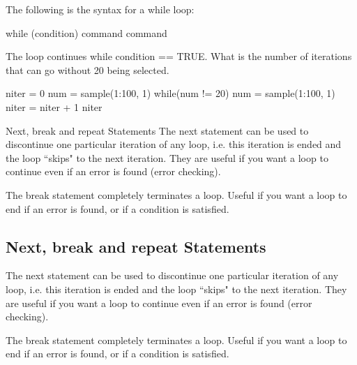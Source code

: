 The following is the syntax for a while loop:

while (condition){
command
command
}

The loop continues while condition == TRUE.
What is the number of iterations that can go without 20 being selected.

niter = 0		
num = sample(1:100, 1)
while(num != 20) 
   {
    num = sample(1:100, 1)
    niter = niter + 1
   }
niter

Next, break and repeat Statements
The next statement can be used to discontinue one particular iteration of any loop, i.e. this iteration is ended and the loop “skips" to the next iteration. They are useful if you want a loop to continue even if an error is found (error checking).

The break statement completely terminates a loop. Useful if you want a loop to end if an error is found, or if a condition is satisfied.

\subsection*{Next, break and repeat Statements}
The next statement can be used to discontinue one particular iteration of any loop, i.e. this iteration is ended and the loop “skips" to the next iteration. They are useful if you want a loop to continue even if an error is found (error checking).

The break statement completely terminates a loop. Useful if you want a loop to end if an error is found, or if a condition is satisfied.




 

